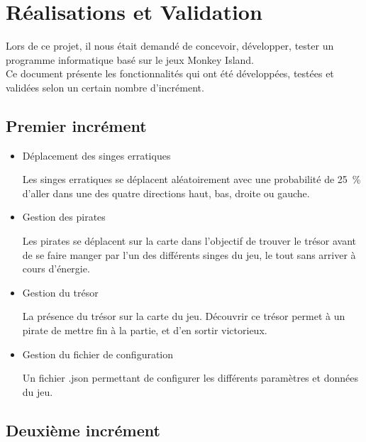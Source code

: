 \section{Réalisations et Validation}
\label{sec:rEtV}

Lors de ce projet, il nous était demandé de concevoir, développer, tester un programme informatique basé sur le jeux Monkey Island.\\
Ce document présente les fonctionnalités qui ont été développées, testées et validées selon un certain nombre d’incrément.

\subsection{Premier incrément}
\label{subsec:inc1}

\begin{itemize}
	\item Déplacement des singes erratiques

	Les singes erratiques se déplacent aléatoirement avec une probabilité de 25 \% d’aller dans une des quatre directions haut, bas, droite ou gauche.

	\item Gestion des pirates

	Les pirates se déplacent sur la carte dans l’objectif de trouver le trésor avant de se faire manger par l'un des différents singes du jeu, le tout sans arriver à cours d'énergie.

	\item Gestion du trésor

	La présence du trésor sur la carte du jeu. Découvrir ce trésor permet à un pirate de mettre fin à la partie, et d'en sortir victorieux.

	\item Gestion du fichier de configuration

	Un fichier .json permettant de configurer les différents paramètres et données du jeu.
\end{itemize}

\subsection{Deuxième incrément}
\label{subsec:inc2}

